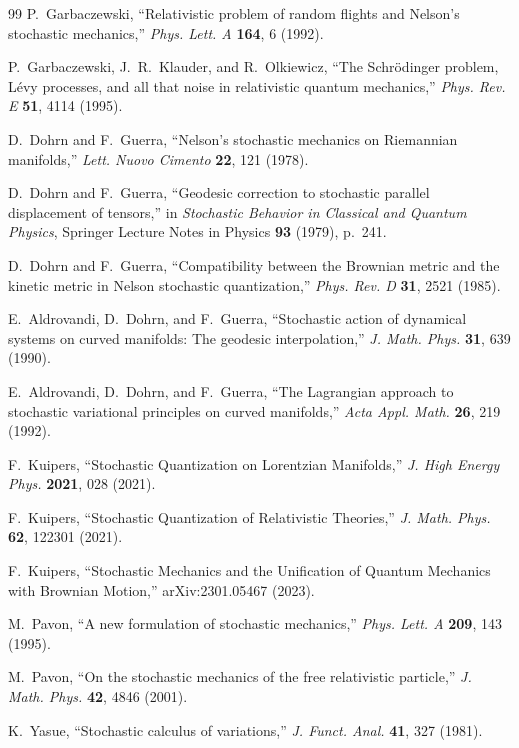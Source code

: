 \documentclass[11pt]{article}
\begin{document}
\begin{thebibliography}{99}
 P.~Garbaczewski, ``Relativistic problem of random flights and Nelson's stochastic mechanics,'' \emph{Phys. Lett. A} \textbf{164}, 6 (1992).

 P.~Garbaczewski, J.~R.~Klauder, and R.~Olkiewicz, ``The Schrödinger problem, Lévy processes, and all that noise in relativistic quantum mechanics,'' \emph{Phys. Rev. E} \textbf{51}, 4114 (1995).

 D.~Dohrn and F.~Guerra, ``Nelson's stochastic mechanics on Riemannian manifolds,'' \emph{Lett. Nuovo Cimento} \textbf{22}, 121 (1978).

 D.~Dohrn and F.~Guerra, ``Geodesic correction to stochastic parallel displacement of tensors,'' in \emph{Stochastic Behavior in Classical and Quantum Physics}, Springer Lecture Notes in Physics \textbf{93} (1979), p.~241.

 D.~Dohrn and F.~Guerra, ``Compatibility between the Brownian metric and the kinetic metric in Nelson stochastic quantization,'' \emph{Phys. Rev. D} \textbf{31}, 2521 (1985).

 E.~Aldrovandi, D.~Dohrn, and F.~Guerra, ``Stochastic action of dynamical systems on curved manifolds: The geodesic interpolation,'' \emph{J. Math. Phys.} \textbf{31}, 639 (1990).

 E.~Aldrovandi, D.~Dohrn, and F.~Guerra, ``The Lagrangian approach to stochastic variational principles on curved manifolds,'' \emph{Acta Appl. Math.} \textbf{26}, 219 (1992).

 F.~Kuipers, ``Stochastic Quantization on Lorentzian Manifolds,'' \emph{J. High Energy Phys.} \textbf{2021}, 028 (2021).

 F.~Kuipers, ``Stochastic Quantization of Relativistic Theories,'' \emph{J. Math. Phys.} \textbf{62}, 122301 (2021).

 F.~Kuipers, ``Stochastic Mechanics and the Unification of Quantum Mechanics with Brownian Motion,'' arXiv:2301.05467 (2023).

 M.~Pavon, ``A new formulation of stochastic mechanics,'' \emph{Phys. Lett. A} \textbf{209}, 143 (1995).

 M.~Pavon, ``On the stochastic mechanics of the free relativistic particle,'' \emph{J. Math. Phys.} \textbf{42}, 4846 (2001).

 K.~Yasue, ``Stochastic calculus of variations,'' \emph{J. Funct. Anal.} \textbf{41}, 327 (1981).


\end{thebibliography}
\end{document}
